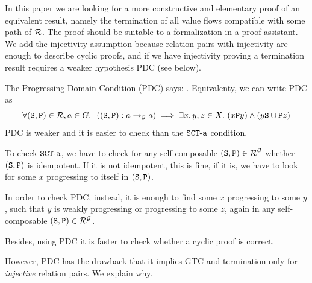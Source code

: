 \documentclass{lmcs}
\begin{document}
In this paper we are looking for a more
constructive and elementary proof of an equivalent result, 
namely the termination
of all value flows compatible with some path of $\setR$.
The proof should be suitable to a formalization in a proof assistant.
We add the injectivity assumption because relation pairs with
injectivity are enough to describe cyclic proofs, and if we have injectivity
proving a termination result requires a weaker hypothesis PDC (see below). 


The Progressing Domain Condition (PDC) says: 
. Equivalenty, we can write PDC as
$$
\forall (\Stat,\Prog) \in \setR, a \in G. 
\ \ (\composable{\setG}{a}{a}{(\Stat,\Prog)}) \implies \exists x, y, z \in X. 
\ (x \Prog y) \wedge (y \Stat \cup \Prog z)
$$
PDC is weaker and it is easier to check than the $\SCTa$ condition. 

To check $\SCTa$, we have to check for any self-composable $(\Stat,\Prog) \in \setR^\setG$
whether $(\Stat,\Prog)$ is idempotent. If it is not idempotent, this is fine, if it is, we have to 
look for some $x$ progressing to itself in $(\Stat,\Prog)$.

In order to check PDC, instead, it is enough to find some $x$ progressing 
to some $y$, such that $y$ is weakly progressing or progressing to some $z$,
again in any self-composable $(\Stat,\Prog) \in \setR^\setG$.

Besides, using PDC it is faster to check whether a cyclic proof is correct.

However, PDC has the drawback that it implies 
GTC and termination only for \emph{injective} relation pairs. 
We explain why.

\end{document}
